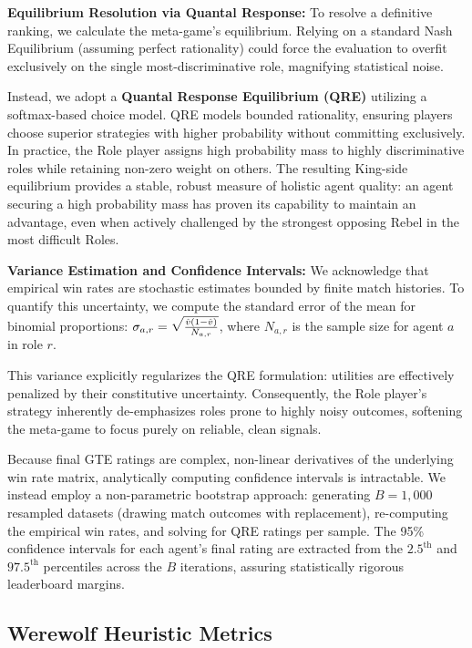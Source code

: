 \documentclass{article}
\begin{document}
\textbf{Equilibrium Resolution via Quantal Response:}
To resolve a definitive ranking, we calculate the meta-game's equilibrium. Relying on a standard Nash Equilibrium (assuming perfect rationality) could force the evaluation to overfit exclusively on the single most-discriminative role, magnifying statistical noise. 

Instead, we adopt a \textbf{Quantal Response Equilibrium (QRE)} utilizing a softmax-based choice model. QRE models bounded rationality, ensuring players choose superior strategies with higher probability without committing exclusively. In practice, the Role player assigns high probability mass to highly discriminative roles while retaining non-zero weight on others. The resulting King-side equilibrium provides a stable, robust measure of holistic agent quality: an agent securing a high probability mass has proven its capability to maintain an advantage, even when actively challenged by the strongest opposing Rebel in the most difficult Roles.

\textbf{Variance Estimation and Confidence Intervals:}
We acknowledge that empirical win rates are stochastic estimates bounded by finite match histories. To quantify this uncertainty, we compute the standard error of the mean for binomial proportions: $\sigma_{a,r} = \sqrt{\smash[b]{\frac{\hat{v}(1-\hat{v})}{N_{a,r}}}}$, where $N_{a,r}$ is the sample size for agent $a$ in role $r$.

This variance explicitly regularizes the QRE formulation: utilities are effectively penalized by their constitutive uncertainty. Consequently, the Role player's strategy inherently de-emphasizes roles prone to highly noisy outcomes, softening the meta-game to focus purely on reliable, clean signals. 

Because final GTE ratings are complex, non-linear derivatives of the underlying win rate matrix, analytically computing confidence intervals is intractable. We instead employ a non-parametric bootstrap approach: generating $B=1,000$ resampled datasets (drawing match outcomes with replacement), re-computing the empirical win rates, and solving for QRE ratings per sample. The 95\% confidence intervals for each agent's final rating are extracted from the $2.5^{\text{th}}$ and $97.5^{\text{th}}$ percentiles across the $B$ iterations, assuring statistically rigorous leaderboard margins.

\subsection{Werewolf Heuristic Metrics}
\label{app:werewolf_heuristics}
\end{document}
